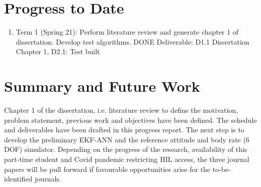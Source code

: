 
\section{Progress to Date}\label{CHAP1_7}
\begin{enumerate}
    \item Term 1 (Spring 21):  Perform literature review and generate chapter 1 of dissertation. Develop test algorithms. DONE
    Deliverable: D1.1 Dissertation Chapter 1, D2.1: Test built

\end{enumerate}

\section{Summary and Future Work}\label{CHAP1_8}
Chapter 1 of the dissertation, i.e. literature review to define the motivation, problem statement, previous work and objectives have been defined. The schedule and deliverables have been drafted in this progress report. The next step is to develop the preliminary EKF-ANN and the reference attitude and body rate (6 DOF) simulator. Depending on the progress of the research, availability of this part-time student and Covid pandemic restricting HIL access, the three journal papers will be pull forward if favourable opportunities arise for the to-be-identified journals. 



